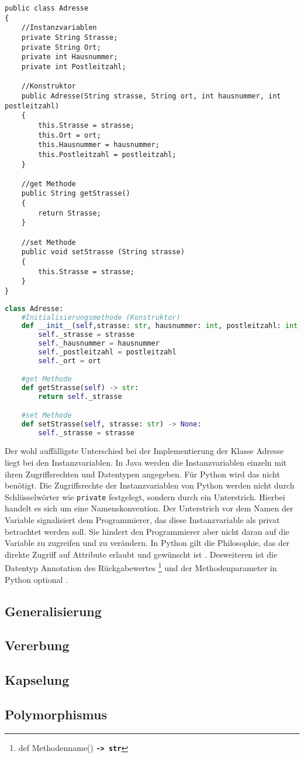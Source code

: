 \begin{lstlisting}[caption=Die Klasse Adresse in Java, label=Adressejava]
public class Adresse
{
    //Instanzvariablen
    private String Strasse;
    private String Ort;
    private int Hausnummer;
    private int Postleitzahl;

    //Konstruktor
    public Adresse(String strasse, String ort, int hausnummer, int postleitzahl)
    {
        this.Strasse = strasse;
        this.Ort = ort;
        this.Hausnummer = hausnummer;
        this.Postleitzahl = postleitzahl;
    }

    //get Methode
    public String getStrasse() 
    {
        return Strasse;
    }

    //set Methode
    public void setStrasse (String strasse)
    {
        this.Strasse = strasse;
    }
}
\end{lstlisting}

\begin{lstlisting}[caption=Die Klasse Adresse in Python, label=AdressePython,language=Python]
class Adresse:
    #Initialisierungsmethode (Konstruktor)
    def __init__(self,strasse: str, hausnummer: int, postleitzahl: int, ort: str) -> None:
        self._strasse = strasse
        self._hausnummer = hausnummer
        self._postleitzahl = postleitzahl
        self._ort = ort   

    #get Methode
    def getStrasse(self) -> str:
        return self._strasse

    #set Methode
    def setStrasse(self, strasse: str) -> None:
        self._strasse = strasse

\end{lstlisting}

Der wohl auffälligste Unterschied bei der Implementierung der Klasse Adresse liegt bei den Instanzvariablen. In Java werden die Instanzvariablen einzeln mit ihren Zugriffsrechten und Datentypen angegeben. Für Python wird das nicht benötigt. Die Zugriffsrechte der Instanzvariablen von Python werden nicht durch Schlüsselwörter wie \texttt{private} festgelegt, sondern durch ein Unterstrich. Hierbei handelt es sich um eine Namenskonvention. Der Unterstrich vor dem Namen der Variable signalisiert dem Programmierer, das diese Instanzvariable als privat betrachtet werden soll. Sie hindert den Programmierer aber nicht daran auf die Variable zu zugreifen und zu verändern. In Python gilt die Philosophie, das der direkte Zugriff auf Attribute erlaubt und gewünscht ist \cite{PythonKalista}. Desweiteren ist die Datentyp Annotation des Rückgabewertes \footnote{def Methodenname() \textbf{\texttt{-> str}}} und der Methodenparameter in Python optional \cite{PythonBarry}. 


\subsection{Generalisierung}

\subsection{Vererbung}
\subsection{Kapselung}
\subsection{Polymorphismus}


